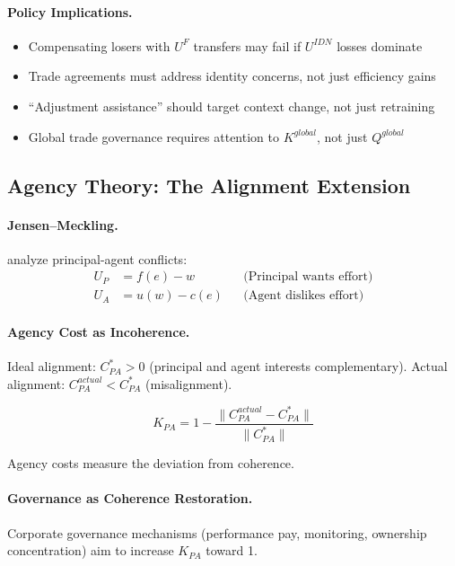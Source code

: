 \documentclass[12pt,a4paper]{article}
\begin{document}
\paragraph{Policy Implications.}
\begin{itemize}
  \item Compensating losers with $U^F$ transfers may fail if $U^{IDN}$ losses dominate
  \item Trade agreements must address identity concerns, not just efficiency gains
  \item ``Adjustment assistance'' should target context change, not just retraining
  \item Global trade governance requires attention to $K^{global}$, not just $Q^{global}$
\end{itemize}

\subsection{Agency Theory: The Alignment Extension}

\paragraph{Jensen--Meckling.}
\citet{jensenmeckling1976} analyze principal-agent conflicts:
\begin{align}
  U_P &= f(e) - w && \text{(Principal wants effort)} \\
  U_A &= u(w) - c(e) && \text{(Agent dislikes effort)}
\end{align}

\paragraph{Agency Cost as Incoherence.}
Ideal alignment: $C_{PA}^* > 0$ (principal and agent interests complementary).
Actual alignment: $C_{PA}^{actual} < C_{PA}^*$ (misalignment).

\begin{equation}
  K_{PA} = 1 - \frac{\|C_{PA}^{actual} - C_{PA}^*\|}{\|C_{PA}^*\|}
\end{equation}

Agency costs measure the deviation from coherence.

\paragraph{Governance as Coherence Restoration.}
Corporate governance mechanisms (performance pay, monitoring, ownership concentration)
aim to increase $K_{PA}$ toward 1.
\end{document}

